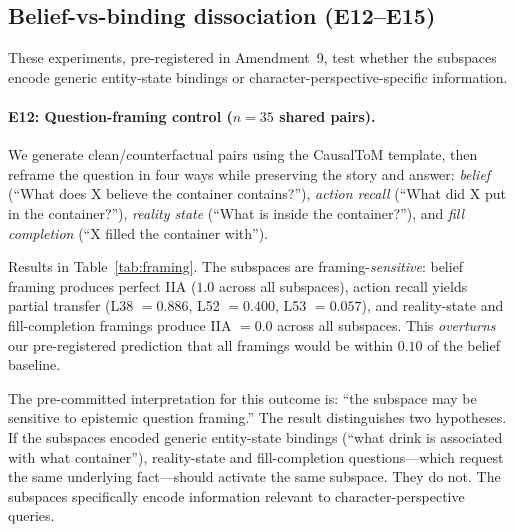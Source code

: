 \documentclass[11pt]{article}
\begin{document}
\subsection{Belief-vs-binding dissociation (E12--E15)}
\label{sec:dissociation_results}

These experiments, pre-registered in Amendment~9, test whether the subspaces encode generic entity-state bindings or character-perspective-specific information.

\paragraph{E12: Question-framing control ($n = 35$ shared pairs).}
We generate clean/counterfactual pairs using the CausalToM template, then reframe the question in four ways while preserving the story and answer: \emph{belief} (``What does X believe the container contains?''), \emph{action recall} (``What did X put in the container?''), \emph{reality state} (``What is inside the container?''), and \emph{fill completion} (``X filled the container with'').

Results in Table~\ref{tab:framing}. The subspaces are framing-\emph{sensitive}: belief framing produces perfect IIA ($1.0$ across all subspaces), action recall yields partial transfer (L38 $= 0.886$, L52 $= 0.400$, L53 $= 0.057$), and reality-state and fill-completion framings produce IIA $= 0.0$ across all subspaces. This \emph{overturns} our pre-registered prediction that all framings would be within $0.10$ of the belief baseline.

The pre-committed interpretation for this outcome is: ``the subspace may be sensitive to epistemic question framing.'' The result distinguishes two hypotheses. If the subspaces encoded generic entity-state bindings (``what drink is associated with what container''), reality-state and fill-completion questions---which request the same underlying fact---should activate the same subspace. They do not. The subspaces specifically encode information relevant to character-perspective queries.
\end{document}
